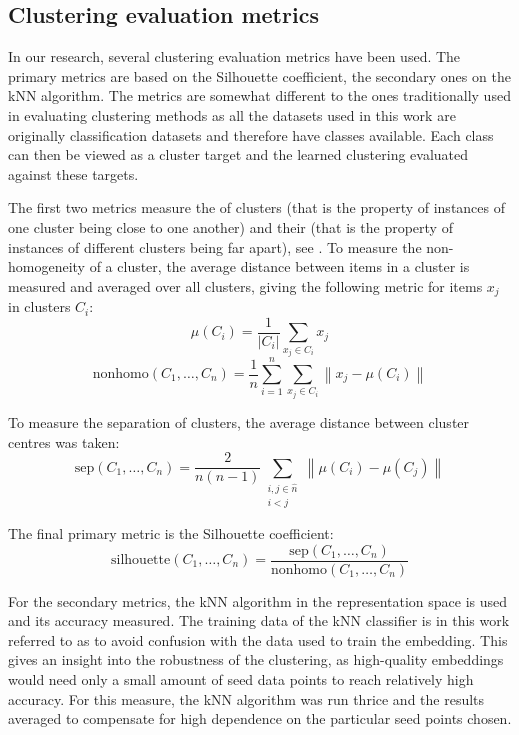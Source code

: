 \subsection{Clustering evaluation metrics}\label{sec:clustering-metrics}
In our research, several clustering evaluation metrics have been used. The primary metrics are based on the Silhouette coefficient, the secondary ones on the kNN algorithm. The metrics are somewhat different to the ones traditionally used in evaluating clustering methods as all the datasets used in this work are originally classification datasets and therefore have classes available. Each class can then be viewed as a cluster target and the learned clustering evaluated against these targets.

The first two metrics measure the  of clusters (that is the property of instances of one cluster being close to one another) and their  (that is the property of instances of different clusters being far apart), see \cite{everitt_cluster_2001}. To measure the non-homogeneity of a cluster, the average distance between items in a cluster is measured and averaged over all clusters, giving the following metric for items \( x_j \) in clusters \( C_i \):
\[ \mu \left( C_i \right) = \frac{1}{\left\lvert C_i \right\rvert} \sum_{x_j \in C_i} x_j \]
\[ \mathrm{nonhomo} \left( C_1, \dots, C_n \right) = \frac{1}{n} \sum_{i = 1}^n \sum_{x_j \in C_i} \left\lVert x_j - \mu \left( C_i \right) \right\rVert \]

To measure the separation of clusters, the average distance between cluster centres was taken:
\[ \mathrm{sep} \left( C_1, \dots, C_n \right) = \frac{2}{n \left( n - 1 \right)} \sum_{\substack{i, j \in \hat{n} \\ i < j }} \left\lVert \mu \left( C_i \right) - \mu \left( C_j \right) \right\rVert \]

The final primary metric is the Silhouette coefficient:
\[ \mathrm{silhouette} \left( C_1, \dots, C_n \right) = \frac{\mathrm{sep} \left( C_1, \dots, C_n \right)}{\mathrm{nonhomo} \left( C_1, \dots, C_n \right)} \]

For the secondary metrics, the kNN algorithm in the representation space is used and its accuracy measured. The training data of the kNN classifier is in this work referred to as  to avoid confusion with the data used to train the embedding. This gives an insight into the robustness of the clustering, as high-quality embeddings would need only a small amount of seed data points to reach relatively high accuracy. For this measure, the kNN algorithm was run thrice and the results averaged to compensate for high dependence on the particular seed points chosen.
